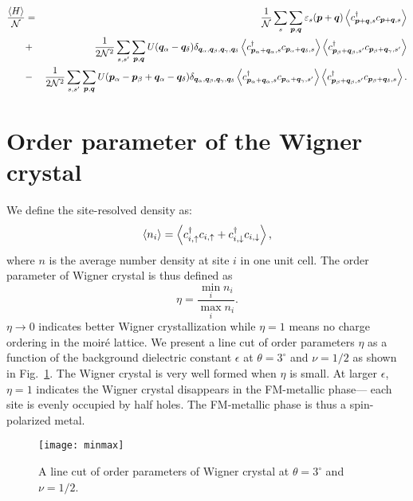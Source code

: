 \documentclass[aps,prl,floatfix,twocolumn]{revtex4-1}
\begin{document}
\begin{widetext}
	\begin{eqnarray}\label{eq:totalE}
		\frac{\expval{H}}{\mathcal{N}}&=&\frac{1}{\mathcal{N}}\sum_{s} \sum_{\bm{p},\bm{q}}  \varepsilon_s\qty(\bm{p}+\bm{q})\expval{c_{\bm{p}+\bm{q},s}^\dagger c_{\bm{p}+\bm{q},s}}\\
		&+&\frac{1}{2\mathcal{N}^2}\sum_{s,s'}  \sum_{\bm{p},\bm{q}}   U(\bm{q}_\alpha-\bm{q}_\delta) \delta_{\bm{q}_\alpha,\bm{q}_\beta,\bm{q}_\gamma,\bm{q}_\delta} \expval{c_{\bm{p}_\alpha+\bm{q}_\alpha,s}^\dagger c_{\bm{p}_\alpha+\bm{q}_\delta,s}} \expval{c_{\bm{p}_\beta+\bm{q}_\beta,s'}^\dagger c_{\bm{p}_\beta+\bm{q}_\gamma,s'}}\\
		&-&\frac{1}{2\mathcal{N}^2}\sum_{s,s'}  \sum_{\bm{p},\bm{q}}  U(\bm{p}_\alpha-\bm{p}_\beta+\bm{q}_\alpha-\bm{q}_\delta)\delta_{\bm{q}_\alpha,\bm{q}_\beta,\bm{q}_\gamma,\bm{q}_\delta} \expval{c_{\bm{p}_\alpha+\bm{q}_\alpha,s}^\dagger c_{\bm{p}_\alpha+\bm{q}_\gamma,s'}} \expval{c_{\bm{p}_\beta+\bm{q}_\beta,s'}^\dagger c_{\bm{p}_\beta+\bm{q}_\delta,s}}.
	\end{eqnarray}
\end{widetext}

\section{Order parameter of the Wigner crystal}

We define the site-resolved density as:
\begin{equation}
	\expval{n_i}=\expval{{c}_{i,\uparrow}^\dagger {c}_{i,\uparrow}+{c}_{i,\downarrow}^\dagger {c}_{i,\downarrow}},
\end{equation}
where $ n $ is the average number density at site $ i $ in one unit cell. The order parameter of Wigner crystal is thus defined as
\begin{equation}\label{eq:eta}
	\eta=\frac{\min\limits_{i} n_i}{\max\limits_{i} n_i}.
\end{equation}
$ \eta\rightarrow0 $ indicates better Wigner crystallization while $ \eta=1 $ means no charge ordering in the moir\'e lattice. We present a line cut of order parameters $ \eta $ as a function of the background dielectric constant $ \epsilon $ at $ \theta=3^\circ $ and $ \nu=1/2 $ as shown in Fig.~\ref{fig:minmax}. The Wigner crystal is very well formed when $ \eta $ is small. At larger $ \epsilon $, $ \eta=1 $ indicates the Wigner crystal disappears in the FM-metallic phase--- each site is evenly occupied by half holes. The FM-metallic phase is thus a spin-polarized metal.
\begin{figure}[t]
	\centering
	\texttt{[image: minmax]}
	\caption{A line cut of order parameters of Wigner crystal at $ \theta=3^\circ $ and $ \nu=1/2 $.}
	\label{fig:minmax}
\end{figure}
\end{document}
